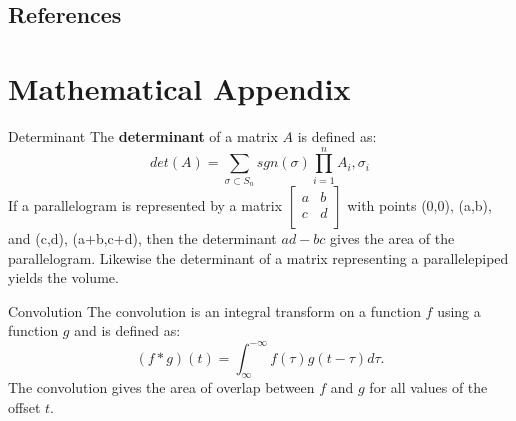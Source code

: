 \documentclass[xcolor=dvipsnames]{beamer}
\begin{document}
\subsection{References}

\section{Mathematical Appendix}

\begin{frame}[label=math-determinant]{Determinant}
The \textbf{determinant} of a matrix $A$ is defined as:
 \begin{equation}
  det(A) = \sum_{\sigma \subset S_n} sgn(\sigma)
           \prod_{i=1}^{n} A_i,\sigma_i
 \end{equation}
If a parallelogram is represented by a matrix 
$
 \begin{bmatrix}
   a &
   b \\
   c &
   d \\
 \end{bmatrix}
$
with points (0,0), (a,b), and (c,d), (a+b,c+d), then the determinant $ad-bc$ gives the area of the parallelogram. Likewise the determinant of a matrix representing a parallelepiped yields the volume. 
\end{frame}

\begin{frame}[label=math-convolution]{Convolution}
 The convolution is an integral transform on a function $f$ using a function $g$ and is defined as:
 \begin{equation}
  (f*g)(t) = \int_{\infty}^{-\infty} f(\tau) g(t-\tau) d\tau.
 \end{equation}
 The convolution gives the area of overlap between $f$ and $g$ for all values of the offset $t$.
\end{frame}
\end{document}
